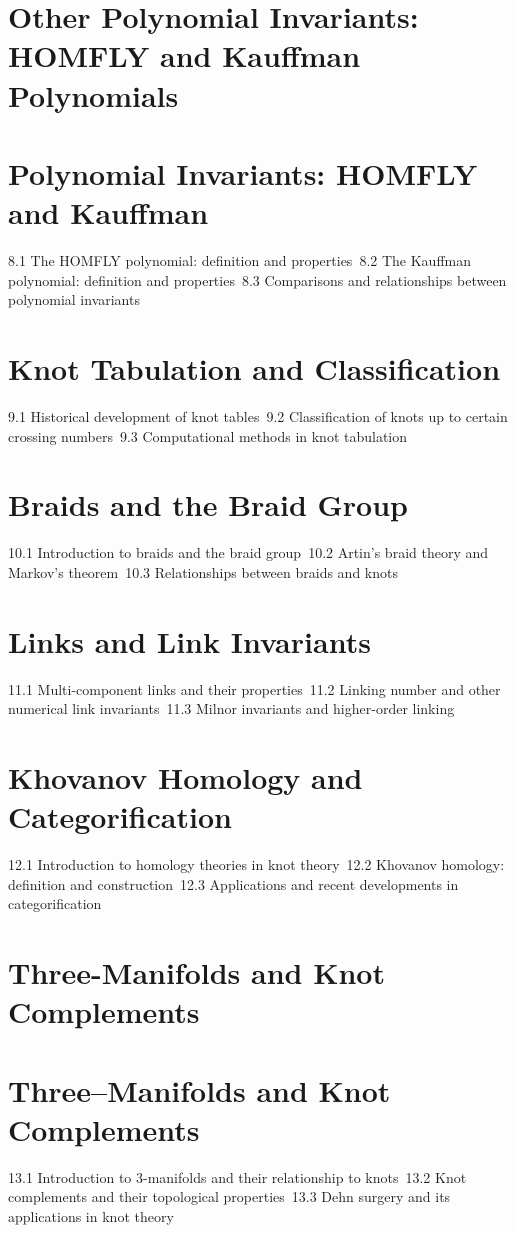 \section{Other Polynomial Invariants: HOMFLY and Kauffman Polynomials}
\section{Polynomial Invariants: HOMFLY and Kauffman}
8.1 The HOMFLY polynomial: definition and properties\
8.2 The Kauffman polynomial: definition and properties\
8.3 Comparisons and relationships between polynomial invariants\
\section{Knot Tabulation and Classification}
9.1 Historical development of knot tables\
9.2 Classification of knots up to certain crossing numbers\
9.3 Computational methods in knot tabulation\
\section{Braids and the Braid Group}
10.1 Introduction to braids and the braid group\
10.2 Artin's braid theory and Markov's theorem\
10.3 Relationships between braids and knots\
\section{Links and Link Invariants}
11.1 Multi-component links and their properties\
11.2 Linking number and other numerical link invariants\
11.3 Milnor invariants and higher-order linking\
\section{Khovanov Homology and Categorification}
12.1 Introduction to homology theories in knot theory\
12.2 Khovanov homology: definition and construction\
12.3 Applications and recent developments in categorification\
\section{Three-Manifolds and Knot Complements}
\section{Three–Manifolds and Knot Complements}
13.1 Introduction to 3-manifolds and their relationship to knots\
13.2 Knot complements and their topological properties\
13.3 Dehn surgery and its applications in knot theory\
